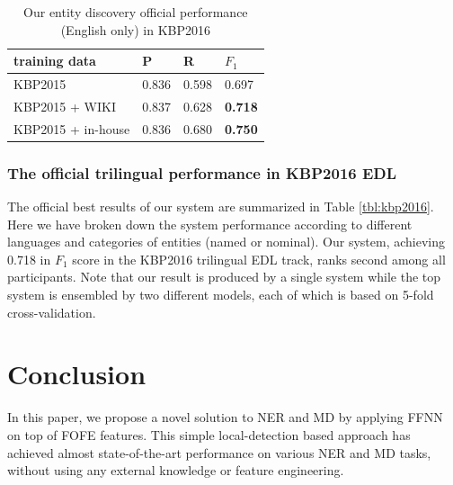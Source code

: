 \documentclass[11pt,a4paper]{article}
\begin{document}
\begin{table}[h]
	\centering
	\begin{tabular}{|l|ll|l|}
		\hline
		training data  &  P   &  R  &  $F_1$ \\ \hline \hline
		KBP2015 & 0.836 & 0.598 & 0.697 \\
		KBP2015 + WIKI &  0.837 & 0.628 & \bf 0.718 \\
		KBP2015 + in-house & 0.836 & 0.680 & \bf 0.750 \\ 
		\hline
	\end{tabular}
	\caption{Our entity discovery official performance (English only) in KBP2016 
	}
	\label{tbl:kbp2016-EDL1}	
\end{table}


\subsubsection{The official trilingual performance in KBP2016 EDL}


The official best results of our system are summarized in Table \ref{tbl:kbp2016}. 
Here we have broken down the system performance according to different languages and categories of entities (named or nominal). Our system, achieving 0.718 in $F_1$ score in the KBP2016 trilingual EDL track, ranks second among all participants. Note that our result is produced by a single system while the top system is ensembled by two different models, each of which is based on 5-fold cross-validation.


\section{Conclusion}

In this paper, we propose a novel solution to NER and MD by applying FFNN on top of FOFE features.
This simple local-detection based approach has achieved almost state-of-the-art performance on various NER and MD tasks, without using any external knowledge or feature engineering.
\end{document}
